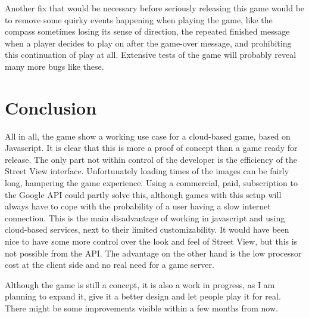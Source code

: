 \documentclass[a4paper,10pt]{article}
\begin{document}
Another fix that would be necessary before seriously releasing this game would be to remove some quirky events happening when playing the game, like the compass sometimes losing its sense of direction, the repeated finished message when a player decides to play on after the game-over message, and prohibiting this continuation of play at all. Extensive tests of the game will probably reveal many more bugs like these.


\section{Conclusion} %
\label{sub:conclusion}
All in all, the game show a working use case for a cloud-based game, based on Javascript. It is clear that this is more a proof of concept than a game ready for release. The only part not within control of the developer is the efficiency of the Street View interface. Unfortunately loading times of the images can be fairly long, hampering the game experience. Using a commercial, paid, subscription to the Google API could partly solve this, although games with this setup will always have to cope with the probability of a user having a slow internet connection. This is the main disadvantage of working in javascript and using cloud-based services, next to their limited customizability. It would have been nice to have some more control over the look and feel of Street View, but this is not possible from the API. The advantage on the other hand is the low processor cost at the client side and no real need for a game server.

Although the game is still a concept, it is also a work in progress, as I am planning to expand it, give it a better design and let people play it for real. There might be some improvements visible within a few months from now.
\end{document}
